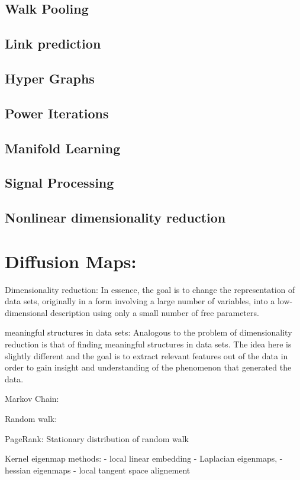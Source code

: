 \subsection{Walk Pooling}
\subsection{Link prediction}
\subsection{Hyper Graphs}
\subsection{Power Iterations}
\subsection{Manifold Learning}
\subsection{Signal Processing}
\subsection{Nonlinear dimensionality reduction}



\section{Diffusion Maps:}
\citet{diffusionMaps}
\cite{diffusionMaps}

Dimensionality reduction:
In essence, the goal is to change the representation of data sets, originally in a form involving a large number of variables, into a
low-dimensional description using only a small number of free parameters.

meaningful structures in data sets:
Analogous to the problem of dimensionality reduction is that of finding meaningful structures in data sets. The idea here is slightly
different and the goal is to extract relevant features out of the data in order to gain insight and understanding of the
phenomenon that generated the data.

Markov Chain:

Random walk:

PageRank:
Stationary distribution of random walk

Kernel eigenmap methods:
- local linear embedding
- Laplacian eigenmaps,
- hessian eigenmaps
- local tangent space alignement

